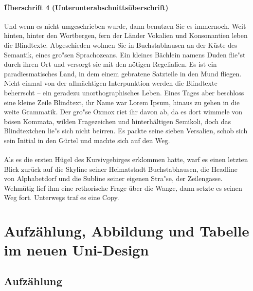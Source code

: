 \documentclass[../thesis.tex]{subfiles}
\begin{document}
\subsubsection{Überschrift 4 (Unterunterabschnittsüberschrift)}

Und wenn es nicht umgeschrieben wurde, dann benutzen Sie es immernoch. Weit hinten, hinter den Wortbergen, fern der Länder Vokalien und Konsonantien leben die Blindtexte. Abgeschieden wohnen Sie in Buchstabhausen an der Küste des Semantik, eines gro"sen Sprachozeans. Ein kleines Bächlein namens Duden flie"st durch ihren Ort und versorgt sie mit den nötigen Regelialien. Es ist ein paradiesmatisches Land, in dem einem gebratene Satzteile in den Mund fliegen. Nicht einmal von der allmächtigen Interpunktion werden die Blindtexte beherrscht – ein geradezu unorthographisches Leben. Eines Tages aber beschloss eine kleine Zeile Blindtext, ihr Name war Lorem Ipsum, hinaus zu gehen in die weite Grammatik. Der gro"se Oxmox riet ihr davon ab, da es dort wimmele von bösen Kommata, wilden Fragezeichen und hinterhältigen Semikoli, doch das Blindtextchen lie"s sich nicht beirren. Es packte seine sieben Versalien, schob sich sein Initial in den Gürtel und machte sich auf den Weg.\\
\\
Als es die ersten Hügel des Kursivgebirges erklommen hatte, warf es einen letzten Blick zurück auf die Skyline seiner Heimatstadt Buchstabhausen, die Headline von Alphabetdorf und die Subline seiner eigenen Stra"se, der Zeilengasse. Wehmütig lief ihm eine rethorische Frage über die Wange, dann setzte es seinen Weg fort. Unterwegs traf es eine Copy.

\normalsize

\chapter{Aufzählung, Abbildung und Tabelle im neuen Uni-Design}




%
%
%
%

\section{Aufzählung}
\end{document}
